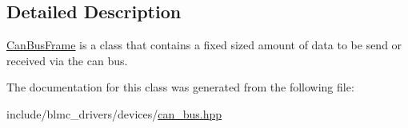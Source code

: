\subsection{Detailed Description}
\hyperlink{classblmc__drivers_1_1CanBusFrame}{Can\+Bus\+Frame} is a class that contains a fixed sized amount of data to be send or received via the can bus. 

The documentation for this class was generated from the following file\+:\begin{DoxyCompactItemize}
\item 
include/blmc\+\_\+drivers/devices/\hyperlink{can__bus_8hpp}{can\+\_\+bus.\+hpp}\end{DoxyCompactItemize}
